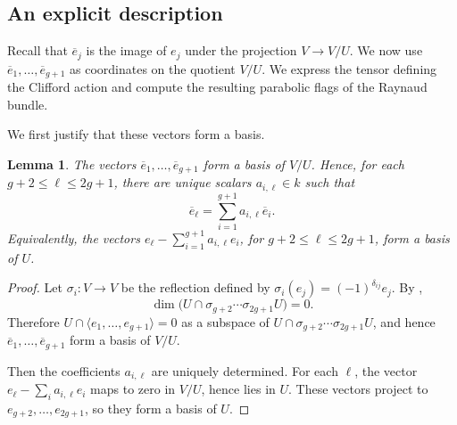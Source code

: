 \documentclass[12pt, letterpaper]{amsart}
\newtheorem{lemma}[theorem]{Lemma}
\theoremstyle{definition}
\begin{document}
\subsection{An explicit description}\label{sec:exp_des}

Recall that \(\overline e_j\) is the image of \(e_j\) under the projection \(V \to V/U\). We now use \(\overline e_1,\dots,\overline e_{g+1}\) as coordinates on the quotient \(V/U\). We express the tensor defining the Clifford action and compute the resulting parabolic flags of the Raynaud bundle.

We first justify that these vectors form a basis.

\begin{lemma}\label{lem:adapted_matrix}
The vectors \(\overline e_1,\dots,\overline e_{g+1}\) form a basis of \(V/U\). Hence, for each \(g+2\le \ell\le2g+1\), there are unique scalars \(a_{i,\ell}\in k\) such that
\[\overline e_\ell=\sum_{i=1}^{g+1}a_{i,\ell}\overline e_i .\]
Equivalently, the vectors \(e_\ell-\sum_{i=1}^{g+1}a_{i,\ell}e_i\), for \(g+2\le\ell\le2g+1\), form a basis of \(U\).
\end{lemma}

\begin{proof}
Let \(\sigma_i : V \to V\) be the reflection defined by \(\sigma_i (e_j) = (-1)^{\delta_{ij}}e_j\). By \cite[Theorem~3.8]{Rei73},
\[\dim\bigl(U\cap\sigma_{g+2}\cdots\sigma_{2g+1}U\bigr)=0.\]
Therefore \(U\cap\langle e_1,\dots,e_{g+1}\rangle=0\) as a subspace of \(U\cap\sigma_{g+2}\cdots\sigma_{2g+1}U\), and hence \(\overline e_1,\dots,\overline e_{g+1}\) form a basis of \(V/U\).

Then the coefficients \(a_{i,\ell}\) are uniquely determined. For each \(\ell\), the vector \(e_\ell-\sum_i a_{i,\ell}e_i\) maps to zero in \(V/U\), hence lies in \(U\). These vectors project to \(e_{g+2},\ldots,e_{2g+1}\), so they form a basis of \(U\).
\end{proof}
\end{document}

